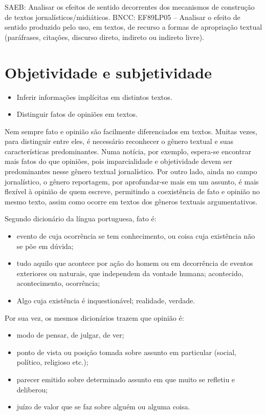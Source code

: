 SAEB: Analisar os efeitos de sentido decorrentes dos mecanismos de
construção de textos jornalísticos/midiáticos. BNCC: EF89LP05 --
Analisar o efeito de sentido produzido pelo uso, em textos, de recurso a
formas de apropriação textual (paráfrases, citações, discurso direto,
indireto ou indireto livre).

\chapter{Objetividade e subjetividade}


\begin{itemize}
\tightlist
\item
  Inferir informações implícitas em distintos textos.
\item
  Distinguir fatos de opiniões em textos.
\end{itemize}

Nem sempre fato e opinião são facilmente diferenciados em textos. Muitas
vezes, para distinguir entre eles, é necessário reconhecer o gênero
textual e suas características predominantes. Numa notícia, por exemplo,
espera-se encontrar mais fatos do que opiniões, pois imparcialidade e
objetividade devem ser predominantes nesse gênero textual jornalístico.
Por outro lado, ainda no campo jornalístico, o gênero reportagem, por
aprofundar-se mais em um assunto, é mais flexível à opinião de quem
escreve, permitindo a coexistência de fato e opinião no mesmo texto,
assim como ocorre em textos dos gêneros textuais argumentativos.

Segundo dicionário da língua portuguesa, fato é:

\begin{itemize}
\tightlist
\item
  evento de cuja ocorrência se tem conhecimento, ou coisa cuja
  existência não se põe em dúvida;
\item
  tudo aquilo que acontece por ação do homem ou em decorrência de
  eventos exteriores ou naturais, que independem da vontade humana;
  acontecido, acontecimento, ocorrência;
\item
  Algo cuja existência é inquestionável; realidade, verdade.
\end{itemize}

Por sua vez, os mesmos dicionários trazem que opinião é:

\begin{itemize}
\tightlist
\item
  modo de pensar, de julgar, de ver;
\item
  ponto de vista ou posição tomada sobre assunto em particular (social,
  político, religioso etc.);
\item
  parecer emitido sobre determinado assunto em que muito se refletiu e
  deliberou;
\item
  juízo de valor que se faz sobre alguém ou alguma coisa.
\end{itemize}

